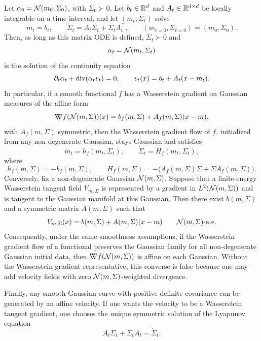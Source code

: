 \begin{prop}\label{prop-gaussian-affine-closure}
	Let $\alpha_0=\mathcal{N}(m_0,\Sigma_0)$, with $\Sigma_0\succ0$. Let $b_t\in\mathbb{R}^d$ and $A_t\in\mathbb{R}^{d\times d}$ be locally integrable on a time interval, and let $(m_t,\Sigma_t)$ solve
	\[
		\dot m_t=b_t,
		\qquad
		\dot\Sigma_t=A_t\Sigma_t+\Sigma_tA_t^\top,
		\qquad
		(m_{t=0},\Sigma_{t=0})=(m_0,\Sigma_0).
	\]
	Then, as long as this matrix ODE is defined, $\Sigma_t\succ0$ and
	\[
		\alpha_t=\mathcal{N}(m_t,\Sigma_t)
	\]
	is the solution of the continuity equation
	\[
		\partial_t\alpha_t+\operatorname{div}(\alpha_t v_t)=0,
		\qquad
		v_t(x)=b_t+A_t(x-m_t).
	\]
	In particular, if a smooth functional $f$ has a Wasserstein gradient on Gaussian measures of the affine form
	\[
		\mathord{\nabla\mkern-9.3mu\nabla} f(\mathcal{N}(m,\Sigma))(x)
		=
		b_f(m,\Sigma)+A_f(m,\Sigma)(x-m),
	\]
	with $A_f(m,\Sigma)$ symmetric, then the Wasserstein gradient flow of $f$, initialized from any non-degenerate Gaussian, stays Gaussian and satisfies
	\[
		\dot m_t=h_f(m_t,\Sigma_t),
		\qquad
		\dot\Sigma_t=H_f(m_t,\Sigma_t),
	\]
	where
	\[
		h_f(m,\Sigma)=-b_f(m,\Sigma),
		\qquad
		H_f(m,\Sigma)
		=
		-\bigl(A_f(m,\Sigma)\Sigma+\Sigma A_f(m,\Sigma)\bigr).
	\]
	Conversely, fix a non-degenerate Gaussian \(\mathcal{N}(m,\Sigma)\). Suppose that a finite-energy Wasserstein tangent field \(V_{m,\Sigma}\) is represented by a gradient in \(L^2(\mathcal{N}(m,\Sigma))\) and is tangent to the Gaussian manifold at this Gaussian. Then there exist \(b(m,\Sigma)\) and a symmetric matrix \(A(m,\Sigma)\) such that
	\[
		V_{m,\Sigma}(x)=b(m,\Sigma)+A(m,\Sigma)(x-m)
		\qquad
		\mathcal{N}(m,\Sigma)\text{-a.e.}
	\]
	Consequently, under the same smoothness assumptions, if the Wasserstein gradient flow of a functional preserves the Gaussian family for all non-degenerate Gaussian initial data, then \(\mathord{\nabla\mkern-9.3mu\nabla} f(\mathcal{N}(m,\Sigma))\) is affine on each Gaussian. Without the Wasserstein gradient representative, this converse is false because one may add velocity fields with zero \(\mathcal{N}(m,\Sigma)\)-weighted divergence.

	Finally, any smooth Gaussian curve with positive definite covariance can be generated by an affine velocity. If one wants the velocity to be a Wasserstein tangent gradient, one chooses the unique symmetric solution of the Lyapunov equation
	\[
		A_t\Sigma_t+\Sigma_t A_t=\dot\Sigma_t.
	\]
\end{prop}

